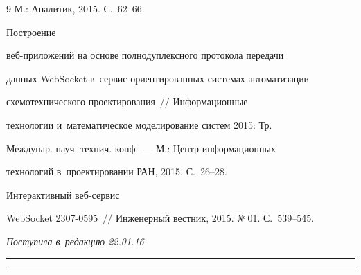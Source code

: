 {{\begin{thebibliography}{9}
М.: Аналитик, 2015. С.~62--66.




 Построение  


веб-приложений на основе полнодуплексного протокола передачи 


данных WebSocket в~сер\-вис-ори\-ен\-ти\-ро\-ван\-ных системах автоматизации 


схемотехнического проектирования~/\!\!/ Информационные 


технологии и~математическое моделирование систем 2015: Тр. 


Междунар. науч.-технич. конф.~--- М.: Центр информационных 


технологий в~проектировании РАН, 2015. С.~26--28.




 Интерактивный веб-сервис 


WebSocket 2307-0595~/\!\!/ Инженерный вестник, 2015. №\,01. С.~539--545.


     \end{thebibliography}


} }








\vspace*{-6pt}





\hfill{\small\textit{Поступила в~редакцию 22.01.16}}














\vspace*{7pt}





\hrule





\vspace*{2pt}





\hrule





\vspace*{-2pt}











